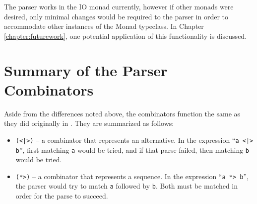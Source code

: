 \documentclass[../main.tex]{subfiles}
\begin{document}
The parser works in the IO monad currently, however if other monads were desired, only minimal changes would be required to the parser in order to accommodate
other instances of the Monad typeclass.  In Chapter \ref{chapter:futurework}, one potential application of this functionality is discussed.


\section{Summary of the Parser Combinators}

Aside from the differences noted above, the combinators function the same as they did originally in \cite{frosthafiz2008}.  They are summarized as follows:

\begin{itemize}
	\item \texttt{(<|>)} -- a combinator that represents an alternative.  In the expression ``\texttt{a <|> b}'', first matching \texttt{a} would be tried, and if that parse failed, then matching \texttt{b} would be tried.
	\item \texttt{(*>)} -- a combinator that represents a sequence.  In the expression ``\texttt{a *> b}'', the parser would try to match \texttt{a} followed by \texttt{b}.  Both must be matched in order for the parse to succeed.
\end{itemize}
\end{document}
